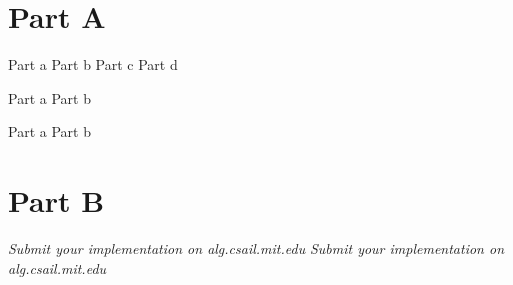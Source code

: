 \documentclass[12pt,twoside]{article}
\begin{document}

\begin{problems}

\section*{Part A}

\problem  %

\begin{problemparts}
\problempart Part a  %
\problempart Part b  %
\problempart Part c  %
\problempart Part d  %
\end{problemparts}

\problem  %

\begin{problemparts}
\problempart Part a %
\problempart Part b %
\end{problemparts}

\problem  %

\begin{problemparts}
\problempart Part a %
\problempart Part b %
\end{problemparts}

\section*{Part B}

\problem
\begin{problemparts}
\problempart \emph{Submit your implementation on alg.csail.mit.edu}
\problempart \emph{Submit your implementation on alg.csail.mit.edu}
\end{problemparts}

\end{problems}
\end{document}
